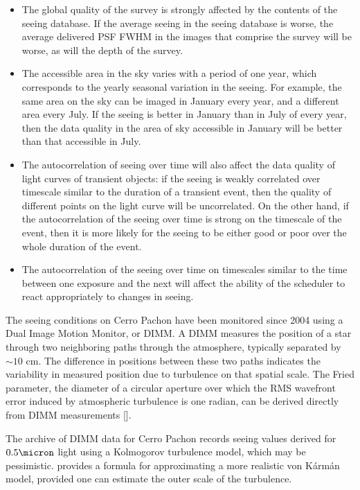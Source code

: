 \documentclass[\docopts]{\docclass}
\begin{document}
\begin{itemize}
  \item The global quality of the survey is strongly affected by the
    contents of the seeing database. If the average seeing in the
    seeing database is worse, the average delivered PSF FWHM in the
    images that comprise the survey will be worse, as will the depth
    of the survey.
  \item The accessible area in the sky varies with a period of one
    year, which corresponds to the yearly seasonal variation in the
    seeing. For example, the same area on the sky can be imaged in
    January every year, and a different area every July. If the seeing
    is better in January than in July of every year, then the data
    quality in the area of sky accessible in January will be better
    than that accessible in July.
  \item The autocorrelation of seeing over time will also affect the
    data quality of light curves of transient objects: if the seeing
    is weakly correlated over timescale similar to the duration of a
    transient event, then the quality of different points on the light
    curve will be uncorrelated. On the other hand, if the
    autocorrelation of the seeing over time is strong on the timescale
    of the event, then it is more likely for the seeing to be either
    good or poor over the whole duration of the event.
  \item The autocorrelation of the seeing over time on timescales
    similar to the time between one exposure and the next will affect
    the ability of the scheduler to react appropriately to changes in
    seeing. 
    
\end{itemize}

The seeing conditions on Cerro Pachon have been monitored since 2004
using a Dual Image Motion Monitor, or DIMM. A DIMM measures the
position of a star through two neighboring paths through the
atmosphere, typically separated by $\sim10 \mbox{ cm}$. The difference
in positions between these two paths indicates the variability in
measured position due to turbulence on that spatial scale. The Fried
parameter, the diameter of a circular aperture over which the RMS
wavefront error induced by atmospheric turbulence is one radian, can
be derived directly from DIMM measurements [\cite{1965JOSA...55.1427F,
    1987PASP...99.1360M, 2002PASP..114.1156T}].

The archive of DIMM data for Cerro Pachon records seeing values
derived for $0.5 \micron$ light using a Kolmogorov turbulence model,
which may be pessimistic. \cite{2002PASP..114.1156T} provides a
formula for approximating a more realistic von K\'arm\'an model,
provided one can estimate the outer scale of the turbulence.
\end{document}
